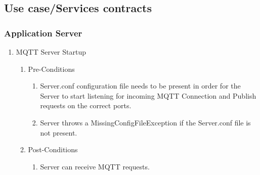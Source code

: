 \documentclass{article}
\begin{document}
\subsection{Use case/Services contracts}
\subsubsection{Application Server}
\begin{enumerate}
	\item	MQTT Server Startup
	\begin{enumerate}
		\item  Pre-Conditions
		\begin{enumerate}
			\item  	Server.conf configuration file needs to be present in order for the Server to start listening for incoming MQTT Connection and 
			Publish requests on the correct ports.
			\item	Server throws a MissingConfigFileException if the Server.conf file is not present.
		\end{enumerate}
		\item  Post-Conditions		
		\begin{enumerate}
			\item	Server can receive MQTT requests.
		\end{enumerate}
	\end{enumerate}
		\end{enumerate}
\end{document}
